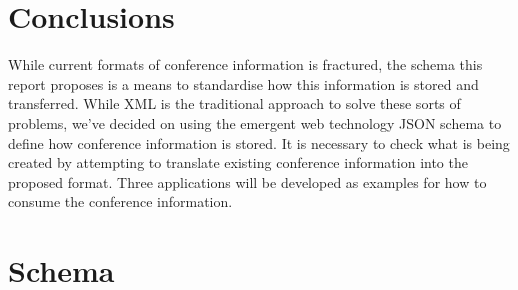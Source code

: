 \documentclass{article}
\begin{document}
\section{Conclusions}
While current formats of conference information is fractured, the schema this report proposes is a means to standardise how this information is stored and transferred. While XML is the traditional approach to solve these sorts of problems, we've decided on using the emergent web technology JSON schema to define how conference information is stored. It is necessary to check what is being created by attempting to translate existing conference information into the proposed format. Three applications will be developed as examples for how to consume the conference information.




\onecolumn
\appendix
\section{Schema}
% 

\end{document}
